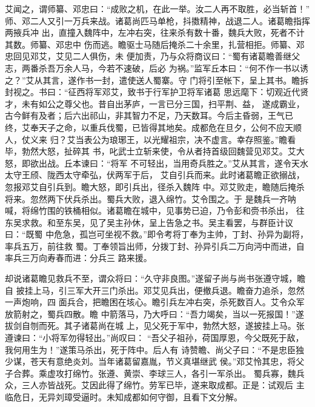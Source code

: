艾闻之，谓师纂、邓忠曰：“成败之机，在此一举。汝二人再不取胜，必当斩首！”
师、邓二人又引一万兵来战。诸葛尚匹马单枪，抖擞精神，战退二人。诸葛瞻指挥两掖兵冲
出，直撞入魏阵中，左冲右突，往来杀有数十番，魏兵大败，死者不计其数。师纂、邓忠中
伤而逃。瞻驱士马随后掩杀二十余里，扎营相拒。师纂、邓忠回见邓艾，艾见二人俱伤，未
便加责，乃与众将商议曰：“蜀有诸葛瞻善继父志，两番杀吾万余人马，今若不速破，后必
为祸。”监军丘本曰：“何不作一书以诱之？”艾从其言，遂作书一封，遣使送人蜀寨。守
门将引至帐下，呈上其书。瞻拆封视之。书曰：“征西将军邓艾，致书于行军护卫将军诸葛
思远麾下：切观近代贤才，未有如公之尊父也。昔自出茅庐，一言已分三国，扫平荆、益，
遂成霸业，古今鲜有及者；后六出祁山，非其智力不足，乃天数耳。今后主昏弱，王气已
终，艾奉天子之命，以重兵伐蜀，已皆得其地矣。成都危在旦夕，公何不应天顺人，仗义来
归？艾当表公为琅琊王，以光耀祖宗，决不虚言。幸存照鉴。”瞻看毕，勃然大怒，扯碎其
书，叱武士立斩来使，令从者持首级回魏营见邓艾。艾大怒，即欲出战。丘本谏曰：“将军
不可轻出，当用奇兵胜之。”艾从其言，遂令天水太守王颀、陇西太守牵弘，伏两军于后，
艾自引兵而来。此时诸葛瞻正欲搦战，忽报邓艾自引兵到。瞻大怒，即引兵出，径杀入魏阵
中。邓艾败走，瞻随后掩杀将来。忽然两下伏兵杀出。蜀兵大败，退入绵竹。艾令围之。于
是魏兵一齐呐喊，将绵竹围的铁桶相似。诸葛瞻在城中，见事势已迫，乃令彭和赍书杀出，
往东吴求救。和至东吴，见了吴主孙休，呈上告急之书。吴主看罢，与群臣计议曰：“既蜀
中危急，孤岂可坐视不救。”即令考将丁奉为主帅，丁封、孙异为副将，率兵五万，前往救
蜀。丁奉领旨出师，分拨丁封、孙异引兵二万向沔中而进，自率兵三万向寿春而进：分兵三
路来援。

却说诸葛瞻见救兵不至，谓众将曰：“久守非良图。”遂留子尚与尚书张遵守城，瞻自
披挂上马，引三军大开三门杀出。邓艾见兵出，便撤兵退。瞻奋力追杀，忽然一声炮响，四
面兵合，把瞻困在垓心。瞻引兵左冲右突，杀死数百人。艾令众军放箭射之，蜀兵四散。瞻
中箭落马，乃大呼曰：“吾力竭矣，当以一死报国！”遂拔剑自刎而死。其子诸葛尚在城
上，见父死于军中，勃然大怒，遂披挂上马。张遵谏曰：“小将军勿得轻出。”尚叹曰：
“吾父子祖孙，荷国厚恩，今父既死于敌，我何用生为！”遂策马杀出，死于阵中。后人有
诗赞瞻、尚父子曰：“不是忠臣独少谋，苍天有意绝炎刘。当年诸葛留嘉胤，节义真堪继武
侯。”邓艾怜其忠，将父子合葬。乘虚攻打绵竹。张遵、黄崇、李球三人，各引一军杀出。
蜀兵寡，魏兵众，三人亦皆战死。艾因此得了绵竹。劳军已毕，遂来取成都。正是：试观后
主临危日，无异刘璋受逼时。未知成都如何守御，且看下文分解。